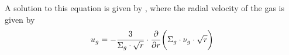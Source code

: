         A solution to this equation is given by \cite{lynden-bell_pringle_1974}, where the 
        radial velocity of the gas is given by
        \begin{equation}
            \label{eq:radial_gas_velocity}
            u_{g}
            =-\frac{3}{\Sigma_g\cdot\sqrt{r}}
                \cdot\frac{\partial }{\partial r}\bigg(\Sigma_g \cdot \nu_g \cdot \sqrt{r}\bigg)
        \end{equation}



